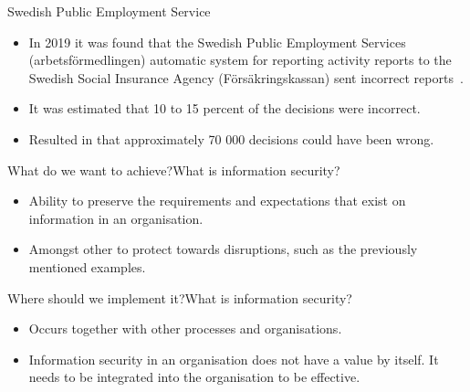 \documentclass{beamer}
\begin{document}
\begin{frame}{Swedish Public Employment Service}
  \begin{itemize}
    \item In 2019 it was found that the Swedish Public Employment Services
      (arbetsförmedlingen) automatic system for reporting activity reports to
      the Swedish Social Insurance Agency (Försäkringskassan) sent incorrect
      reports~\cite{SvTPublicEmpl2019}.
    \item It was estimated that 10 to 15 percent of the decisions were incorrect.
    \item Resulted in that approximately 70 000 decisions could have been wrong.
  \end{itemize}
\end{frame}

\begin{frame}{What do we want to achieve?}{What is information security?}
  \begin{itemize}
    \item Ability to preserve the requirements and expectations that exist on
      information in an organisation.
    \item Amongst other to protect towards disruptions, such as the previously
      mentioned examples.
  \end{itemize}
\end{frame}

\begin{frame}{Where should we implement it?}{What is information security?}
  \begin{itemize}
    \item Occurs together with other processes and organisations.
    \item Information security in an organisation does not have a value by
      itself. It needs to be integrated into the organisation to be effective.
  \end{itemize}
\end{frame}
\end{document}
